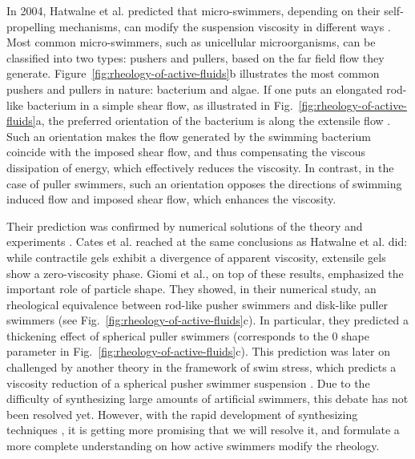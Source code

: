 In 2004, Hatwalne et al. predicted that micro-swimmers, depending on their self-propelling mechanisms, can modify the suspension viscosity in different ways \cite{Hatwalne2004}. Most common micro-swimmers, such as unicellular microorganisms, can be classified into two types: pushers and pullers, based on the far field flow they generate. Figure~\ref{fig:rheology-of-active-fluids}b illustrates the most common pushers and pullers in nature: bacterium and algae. If one puts an elongated rod-like bacterium in a simple shear flow, as illustrated in Fig.~\ref{fig:rheology-of-active-fluids}a, the preferred orientation of the bacterium is along the extensile flow \cite{Forster1974}. Such an orientation makes the flow generated by the swimming bacterium coincide with the imposed shear flow, and thus compensating the viscous dissipation of energy, which effectively reduces the viscosity. In contrast, in the case of puller swimmers, such an orientation opposes the directions of swimming induced flow and imposed shear flow, which enhances the viscosity.

Their prediction was confirmed by numerical solutions of the theory \cite{Cates2008, Giomi2010} and experiments \cite{Sokolov2009, Gachelin2013, Lopez2015}. Cates et al. reached at the same conclusions as Hatwalne et al. did: while contractile gels exhibit a divergence of apparent viscosity, extensile gels show a zero-viscosity phase. Giomi et al., on top of these results, emphasized the important role of particle shape. They showed, in their numerical study, an rheological equivalence between rod-like pusher swimmers and disk-like puller swimmers (see Fig.~\ref{fig:rheology-of-active-fluids}c). In particular, they predicted a thickening effect of spherical puller swimmers (corresponds to the 0 shape parameter in Fig.~\ref{fig:rheology-of-active-fluids}c). This prediction was later on challenged by another theory in the framework of swim stress, which predicts a viscosity reduction of a spherical pusher swimmer suspension \cite{Takatori2017}. Due to the difficulty of synthesizing large amounts of artificial swimmers, this debate has not been resolved yet. However, with the rapid development of synthesizing techniques \cite{Palacci2013, Bricard2013}, it is getting more promising that we will resolve it, and formulate a more complete understanding on how active swimmers modify the rheology.

